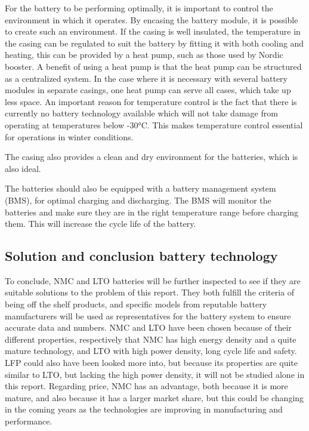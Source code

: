 \documentclass{article}
\begin{document}
For the battery to be performing optimally, it is important to control the environment in which it operates. By encasing the battery module, it is possible to create such an environment. If the casing is well insulated, the temperature in the casing can be regulated to suit the battery by fitting it with both cooling and heating, this can be provided by a heat pump, such as those used by Nordic booster. A benefit of using a heat pump is that the heat pump can be structured as a centralized system. In the case where it is necessary with several battery modules in separate casings, one heat pump can serve all cases, which take up less space. An important reason for temperature control is the fact that there is currently no battery technology available which will not take damage from operating at temperatures below -30°C. This makes temperature control essential for operations in winter conditions.

The casing also provides a clean and dry environment for the batteries, which is also ideal.

The batteries should also be equipped with a battery management system (BMS), for optimal charging and discharging. The BMS will monitor the batteries and make sure they are in the right temperature range before charging them. This will increase the cycle life of the battery.

\subsection*{Solution and conclusion battery technology}

To conclude, NMC and LTO batteries will be further inspected to see if they are suitable solutions to the problem of this report. They both fulfill the criteria of being off the shelf products, and specific models from reputable battery manufacturers will be used as representatives for the battery system to ensure accurate data and numbers. NMC and LTO have been chosen because of their different properties, respectively that NMC has high energy density and a quite mature technology, and LTO with high power density, long cycle life and safety. LFP could also have been looked more into, but because its properties are quite similar to LTO, but lacking the high power density, it will not be studied alone in this report. Regarding price, NMC has an advantage, both because it is more mature, and also because it has a larger market share, but this could be changing in the coming years as the technologies are improving in manufacturing and performance.
 
\end{document}

